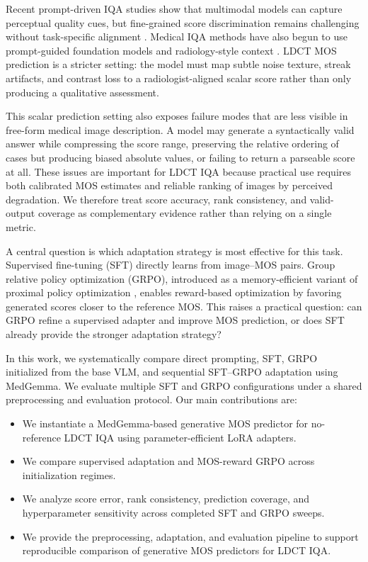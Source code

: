 \documentclass[10pt,twocolumn,letterpaper]{article}
\begin{document}
Recent prompt-driven IQA studies show that multimodal models can capture perceptual quality cues, but fine-grained score discrimination remains challenging without task-specific alignment \cite{wu2024comprehensive}. Medical IQA methods have also begun to use prompt-guided foundation models and radiology-style context \cite{xun2025mediqa,rifa2026capiqa}. LDCT MOS prediction is a stricter setting: the model must map subtle noise texture, streak artifacts, and contrast loss to a radiologist-aligned scalar score rather than only producing a qualitative assessment.

This scalar prediction setting also exposes failure modes that are less visible in free-form medical image description. A model may generate a syntactically valid answer while compressing the score range, preserving the relative ordering of cases but producing biased absolute values, or failing to return a parseable score at all. These issues are important for LDCT IQA because practical use requires both calibrated MOS estimates and reliable ranking of images by perceived degradation. We therefore treat score accuracy, rank consistency, and valid-output coverage as complementary evidence rather than relying on a single metric.

A central question is which adaptation strategy is most effective for this task. Supervised fine-tuning (SFT) directly learns from image--MOS pairs. Group relative policy optimization (GRPO), introduced as a memory-efficient variant of proximal policy optimization \cite{schulman2017ppo,shao2024deepseekmath}, enables reward-based optimization by favoring generated scores closer to the reference MOS. This raises a practical question: can GRPO refine a supervised adapter and improve MOS prediction, or does SFT already provide the stronger adaptation strategy?

In this work, we systematically compare direct prompting, SFT, GRPO initialized from the base VLM, and sequential SFT--GRPO adaptation using MedGemma. We evaluate multiple SFT and GRPO configurations under a shared preprocessing and evaluation protocol. Our main contributions are:
\begin{itemize}
  \item We instantiate a MedGemma-based generative MOS predictor for no-reference LDCT IQA using parameter-efficient LoRA adapters.
  \item We compare supervised adaptation and MOS-reward GRPO across initialization regimes.
  \item We analyze score error, rank consistency, prediction coverage, and hyperparameter sensitivity across completed SFT and GRPO sweeps.
  \item We provide the preprocessing, adaptation, and evaluation pipeline to support reproducible comparison of generative MOS predictors for LDCT IQA.
\end{itemize}
\end{document}
